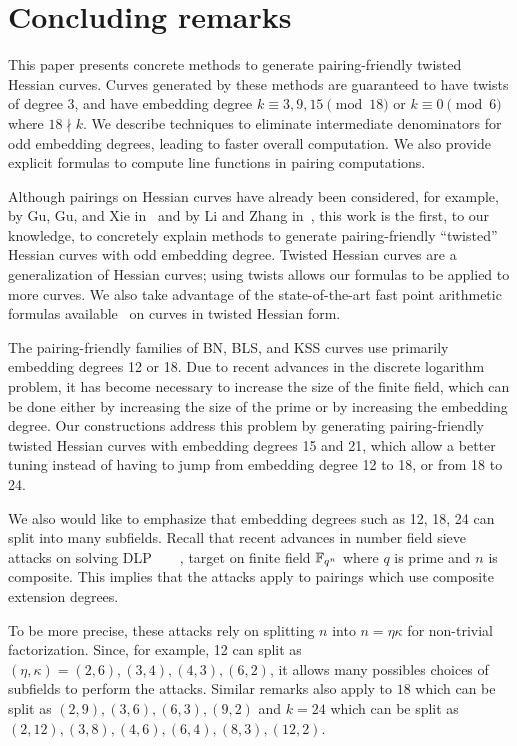 \section{Concluding remarks}
\label{sec:conclude}

This paper presents concrete methods to generate pairing-friendly twisted Hessian curves.
Curves generated by these methods are guaranteed to have twists of degree $3$, and
have embedding degree
$k \equiv 3,9,15 \pmod{18}$ or
$k \equiv 0 \pmod{6}$ where $18 \nmid k$.
We describe techniques to eliminate intermediate denominators for odd embedding degrees, leading to faster overall computation.
We also provide explicit formulas to compute line functions in pairing computations.

Although pairings on Hessian curves have already been considered,
for example, by Gu, Gu, and Xie in~\cite{2010/Gu} and by Li and Zhang in~\cite{2012/Li},
this work is the first, to our knowledge, to concretely explain methods to generate
pairing-friendly ``twisted'' Hessian curves with odd embedding degree.
Twisted Hessian curves are a generalization of Hessian curves; using twists allows our formulas to be applied to more curves.
We also take advantage of the state-of-the-art fast point arithmetic formulas available~\cite{2015/hessian}
on curves in twisted Hessian form.

The pairing-friendly families of BN, BLS, and KSS curves use primarily embedding degrees 12 or 18.
Due to recent advances in the discrete logarithm problem, it has become necessary to increase the size of the finite field,
which can be done either by increasing the size of the prime or by increasing the embedding degree.
Our constructions address this problem by generating pairing-friendly twisted Hessian curves with embedding degrees 15 and 21,
which allow a better tuning instead of having to jump from embedding degree 12 to 18, or from 18 to 24.

We also would like to emphasize that embedding degrees such as 12, 18, 24 can split into many subfields.
Recall that recent advances in number field sieve attacks on solving DLP~\cite{2016/conjugate}~\cite{2016/SS}~\cite{2016/KB}~\cite{2017/KJ},
target on finite field $\mathbb{F}_{q^n}$ where $q$ is prime and $n$ is composite.
This implies that the attacks apply to pairings which use composite extension degrees.

To be more precise, these attacks rely on splitting $n$ into $n = \eta \kappa$ for non-trivial factorization.
Since, for example, 12 can split as $(\eta,\kappa) = (2,6), (3,4), (4,3), (6,2)$,
it allows many possibles choices of subfields to perform the attacks.
Similar remarks also apply to
$18$ which can be split as $(2,9), (3,6), (6,3), (9,2)$
and
$k = 24$ which can be split as $(2,12), (3,8), (4,6), (6,4), (8,3), (12,2)$.

